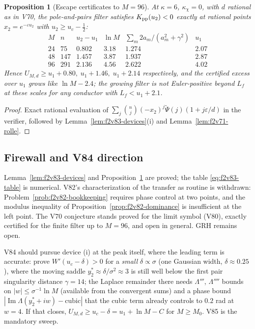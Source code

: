 \documentclass[11pt]{article}
\newtheorem{proposition}[theorem]{Proposition}
\theoremstyle{definition}
\theoremstyle{remark}
\begin{document}
\begin{proposition}[Escape certificates to \(M=96\)]
\label{prop:f2v83-certificates}
At \(\kappa=6\), \(\kappa_\chi=0\), with \(d\) rational as in V70, the
pole-and-pairs filter satisfies \(K_{\rm pp}(u_2)<0\) exactly at
rational points \(x_2=e^{-\varepsilon u_2}\) with \(u_2\ge u_c-\tfrac12\):
\begin{equation}
\begin{array}{c|ccccc}
 M & n & u_2-u_1 & \ln M & \sum_m2a_m/(a_m^2+\gamma^2) & u_1\\ \hline
 24 & 75 & 0.802 & 3.18 & 1.274 & 2.07\\
 48 & 147 & 1.457 & 3.87 & 1.937 & 2.87\\
 96 & 291 & 2.136 & 4.56 & 2.622 & 4.02
\end{array}
\label{eq:f2v83-cert}
\end{equation}
Hence \(U_{M,d}\ge u_1+0.80,\;u_1+1.46,\;u_1+2.14\) respectively, and
the certified excess over \(u_1\) grows like \(\ln M-2.4\); the growing
filter is not Euler-positive beyond \(L_f\) at these scales for any
conductor with \(L_f<u_1+2.1\).
\end{proposition}

\begin{proof}
Exact rational evaluation of \(\sum_j\binom nj(-x_2)^j\widetilde\Psi(j)(1+j\varepsilon/d)\)
in the verifier, followed by Lemma~\ref{lem:f2v83-devices}(i) and
Lemma~\ref{lem:f2v71-rolle}.
\end{proof}

\subsection*{Firewall and V84 direction}
\label{fire:f2v83}
Lemma~\ref{lem:f2v83-devices} and
Proposition~\ref{prop:f2v83-certificates} are proved; the table
\eqref{eq:f2v83-table} is numerical.  V82's characterization of the
transfer as routine is withdrawn: Problem~\ref{prob:f2v82-bookkeeping}
requires phase control at two points, and the modulus inequality of
Proposition~\ref{prop:f2v82-dominance} is insufficient at the left point.
The V70 conjecture stands proved for the limit symbol (V80), exactly
certified for the finite filter up to \(M=96\), and open in general.  GRH
remains open.

V84 should pursue device (i) at the peak itself, where the leading term
is accurate: prove \(W'(u_c-\delta)>0\) for a \emph{small}
\(\delta\propto\sigma\) (one Gaussian width, \(\delta\approx0.25\)), where
the moving saddle \(y_2^*\approx\delta/\sigma^2\approx3\) is still well
below the first pair singularity distance \(\gamma=14\); the Laplace
remainder there needs \(\Lambda'''\), \(\Lambda''''\) bounds on
\(|w|\le\sigma^{-1}\ln M\) (available from the convergent sums) and a
phase bound \(|\operatorname{Im}\Lambda(y_2^*+iw)-\text{cubic}|\) that
the cubic term already controls to \(0.2\) rad at \(w=4\).  If that
closes, \(U_{M,d}\ge u_c-\delta=u_1+\ln M-C\) for \(M\ge M_0\).  V85 is
the mandatory sweep.
\end{document}
